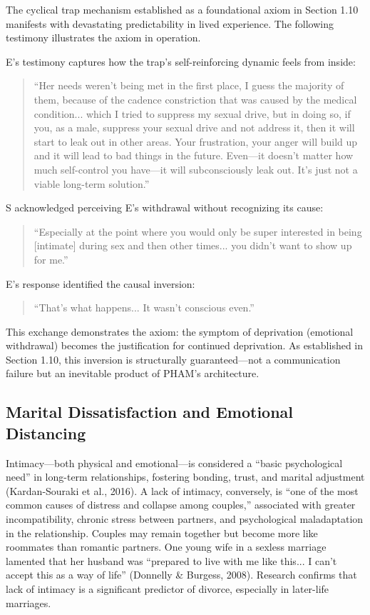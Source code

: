 \documentclass[12pt,openany]{book}
\numberwithin{equation}{chapter}
\begin{document}
The cyclical trap mechanism established as a foundational axiom in Section 1.10 manifests with devastating predictability in lived experience. The following testimony illustrates the axiom in operation.

E's testimony captures how the trap's self-reinforcing dynamic feels from inside:

\begin{quote}
``Her needs weren't being met in the first place, I guess the majority of them, because of the cadence constriction that was caused by the medical condition... which I tried to suppress my sexual drive, but in doing so, if you, as a male, suppress your sexual drive and not address it, then it will start to leak out in other areas. Your frustration, your anger will build up and it will lead to bad things in the future. Even---it doesn't matter how much self-control you have---it will subconsciously leak out. It's just not a viable long-term solution.''
\end{quote}

S acknowledged perceiving E's withdrawal without recognizing its cause:

\begin{quote}
``Especially at the point where you would only be super interested in being [intimate] during sex and then other times... you didn't want to show up for me.''
\end{quote}

E's response identified the causal inversion:

\begin{quote}
``That's what happens... It wasn't conscious even.''
\end{quote}

This exchange demonstrates the axiom: the symptom of deprivation (emotional withdrawal) becomes the justification for continued deprivation. As established in Section 1.10, this inversion is structurally guaranteed---not a communication failure but an inevitable product of PHAM's architecture.

\subsection{Marital Dissatisfaction and Emotional Distancing}

Intimacy---both physical and emotional---is considered a ``basic psychological need'' in long-term relationships, fostering bonding, trust, and marital adjustment (Kardan-Souraki et al., 2016). A lack of intimacy, conversely, is ``one of the most common causes of distress and collapse among couples,'' associated with greater incompatibility, chronic stress between partners, and psychological maladaptation in the relationship. Couples may remain together but become more like roommates than romantic partners. One young wife in a sexless marriage lamented that her husband was ``prepared to live with me like this... I can't accept this as a way of life'' (Donnelly \& Burgess, 2008). Research confirms that lack of intimacy is a significant predictor of divorce, especially in later-life marriages.
\end{document}
